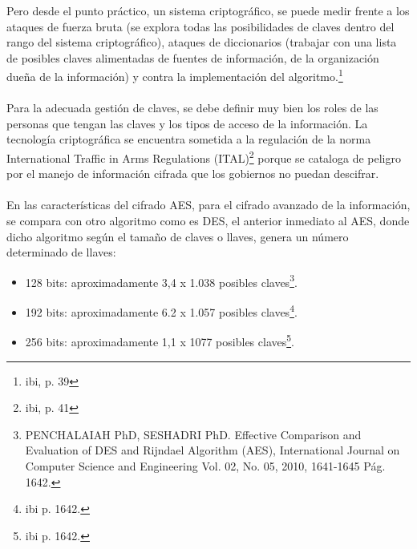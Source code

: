 \documentclass[a4paper,openright,12pt]{book}
\theoremstyle{definition}
\theoremstyle{remark}
\begin{document}
Pero desde el punto práctico, un sistema criptográfico, se puede medir frente a los ataques de fuerza bruta (se explora todas las posibilidades de claves dentro del rango del sistema criptográfico),  ataques de diccionarios (trabajar con una lista de posibles claves alimentadas de fuentes de información, de la organización dueña de la información) y contra la implementación del algoritmo.\footnote{ibi, p. 39}\\\\
Para la adecuada gestión de claves, se debe definir muy bien los roles de las personas que tengan las claves y los tipos de acceso de la información. La tecnología criptográfica se encuentra sometida a la regulación de la norma International Traffic in Arms Regulations (ITAL)\footnote{ibi, p. 41} porque se cataloga de peligro por el manejo de información cifrada que los gobiernos no puedan descifrar.\\\\
En las características del cifrado AES, para el cifrado avanzado de la información, se compara con otro algoritmo como es DES, el anterior inmediato al AES, donde dicho algoritmo según el tamaño de claves o llaves, genera un número determinado de llaves:
\begin{itemize}
	\item 128 bits: aproximadamente 3,4 x 1.038 posibles claves\footnote{PENCHALAIAH PhD, SESHADRI  PhD. Effective Comparison and Evaluation of DES and Rijndael Algorithm (AES), International Journal on Computer Science and Engineering Vol. 02, No. 05, 2010, 1641-1645 Pág. 1642.}.
    \item 192 bits: aproximadamente 6.2 x 1.057 posibles claves\footnote{ibi p. 1642.}.
    \item 256 bits: aproximadamente 1,1 x 1077 posibles claves\footnote{ibi p. 1642.}.
\end{itemize}
\end{document}
